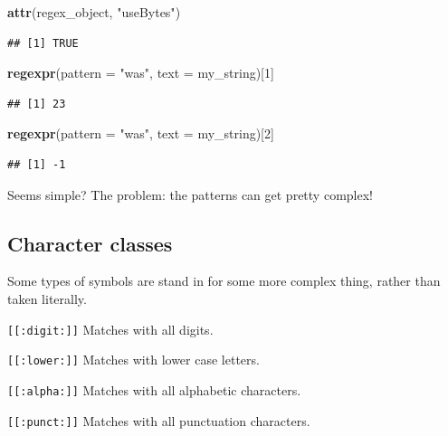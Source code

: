 \documentclass[
]{book}
\newenvironment{Shaded}{\begin{snugshade}}{\end{snugshade}}
\newcommand{\DataTypeTok}[1]{\textcolor[rgb]{0.13,0.29,0.53}{#1}}
\newcommand{\DecValTok}[1]{\textcolor[rgb]{0.00,0.00,0.81}{#1}}
\newcommand{\KeywordTok}[1]{\textcolor[rgb]{0.13,0.29,0.53}{\textbf{#1}}}
\newcommand{\NormalTok}[1]{#1}
\newcommand{\StringTok}[1]{\textcolor[rgb]{0.31,0.60,0.02}{#1}}
\theoremstyle{definition}
\theoremstyle{definition}
\theoremstyle{definition}
\theoremstyle{remark}
\begin{document}
\begin{Shaded}
\begin{Highlighting}[]
\KeywordTok{attr}\NormalTok{(regex\_object, }\StringTok{"useBytes"}\NormalTok{)}
\end{Highlighting}
\end{Shaded}

\begin{verbatim}
## [1] TRUE
\end{verbatim}

\begin{Shaded}
\begin{Highlighting}[]
\KeywordTok{regexpr}\NormalTok{(}\DataTypeTok{pattern =} \StringTok{"was"}\NormalTok{, }\DataTypeTok{text =}\NormalTok{ my\_string)[}\DecValTok{1}\NormalTok{]}
\end{Highlighting}
\end{Shaded}

\begin{verbatim}
## [1] 23
\end{verbatim}

\begin{Shaded}
\begin{Highlighting}[]
\KeywordTok{regexpr}\NormalTok{(}\DataTypeTok{pattern =} \StringTok{"was"}\NormalTok{, }\DataTypeTok{text =}\NormalTok{ my\_string)[}\DecValTok{2}\NormalTok{]}
\end{Highlighting}
\end{Shaded}

\begin{verbatim}
## [1] -1
\end{verbatim}

Seems simple? The problem: the patterns can get pretty complex!

\hypertarget{character-classes}{%
\subsection{Character classes}\label{character-classes}}

Some types of symbols are stand in for some more complex thing, rather than taken literally.

\texttt{{[}{[}:digit:{]}{]}} Matches with all digits.

\texttt{{[}{[}:lower:{]}{]}} Matches with lower case letters.

\texttt{{[}{[}:alpha:{]}{]}} Matches with all alphabetic characters.

\texttt{{[}{[}:punct:{]}{]}} Matches with all punctuation characters.
\end{document}
